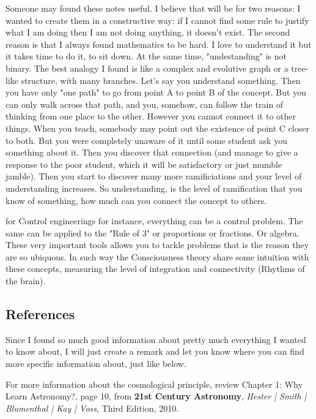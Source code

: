 \documentclass[11pt,fleqn]{book} %
\begin{document}
Someone may found these notes useful.  I believe that will be for two reasons:  I wanted to create them in a constructive way: if I cannot find some rule to justify what I am doing then I am not doing anything, it doesn't exist.  The second reason is that I always found mathematics to be hard.  I love to understand it but it takes time to do it, to sit down.  At the same time, "undestanding" is not binary.  The best analogy I found is like a complex and evolutive graph or a tree-like structure, with many branches.  Let's say you understand something.  Then you have only "one path" to go from point A to point B of the concept.   But you can only walk across that path, and you, somehow, can follow the train of thinking from one place to the other.  However you cannot connect it to other things.  When you teach, somebody may point out the existence of point C closer to both.  But you were completely unaware of it until some student ask you something about it.  Then you discover that connection (and manage to give a response to the poor student, which it will be satisfactory or just mumble jamble).  Then you start to discover many more ramificiations and your level of understanding increases.  So understanding, is the level of ramification that you know of something, how much can you connect the concept to others.   

for Control engineerings for instance, everything can be a control problem.  The same can be applied to the "Rule of 3" or proportions or fractions.  Or algebra.  These very important tools allows you to tackle problems that is the reason they are so ubiquous.  In such way the Consciousness theory share some intuition with these concepts, measuring the level of integration and connectivity (Rhythms of the brain).



\subsection{References}

Since I found so much good information about pretty much everything I wanted to know about, I will just create a remark and let you know where you can find more specific information about, just like below.

\begin{remark}
For more information about the cosmological principle, review Chapter 1: Why Learn Astronomy?, page 10, from \textbf{21st Century Astronomy}, \textit{Hester | Smith | Blumenthal | Kay | Voss}, Third Edition, 2010.
\end{remark}
\end{document}
